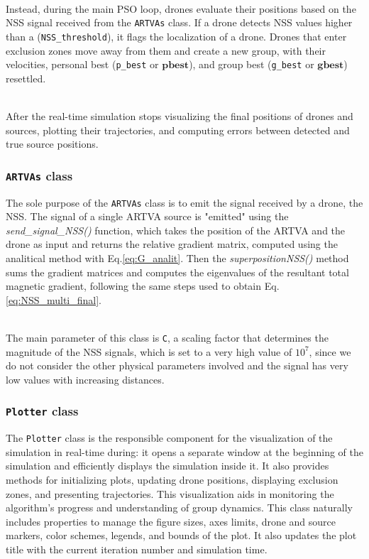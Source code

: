\documentclass[main]{subfiles}
\begin{document}
\noindent\\
Instead, during the main PSO loop, drones evaluate 
their positions based on the NSS signal received from the \texttt{ARTVAs} class. 
If a drone detects NSS values higher than a (\texttt{NSS\_threshold}),
it flags the localization of a drone.
Drones that enter exclusion zones move away from them and 
create a new group, with their velocities, 
personal best (\texttt{p\_best} or $\mathbf{pbest}$), and group best 
(\texttt{g\_best} or $\mathbf{gbest}$) resettled.

\noindent\\
After the real-time simulation stops visualizing the final 
positions of drones and sources, plotting their trajectories, 
and computing errors between detected and true source positions.

\subsubsection{\texttt{ARTVAs} class}
The sole purpose of the \texttt{ARTVAs} class is to 
emit the signal received by a drone, the NSS. 
The signal of a single ARTVA source is "emitted" using the \textit{send\_signal\_NSS()} 
function, which takes the position of the ARTVA and the drone as 
input and returns the relative gradient matrix,
computed using the analitical method with Eq.\ref{eq:G_analit}.
Then the \textit{superpositionNSS()} method sums 
the gradient matrices and computes the eigenvalues of the resultant 
total magnetic gradient,
following the same steps used to obtain Eq.\ref{eq:NSS_multi_final}.

\noindent\\
The main parameter of this class is \texttt{C}, a 
scaling factor that determines the magnitude of the NSS signals, 
which is set to a very high value of $10^7$, since we do not consider
the other physical parameters involved and the signal has very low values
with increasing distances.

\subsubsection{\texttt{Plotter} class}
The \texttt{Plotter} class is the responsible component 
for the visualization of the simulation in real-time during: 
it opens a separate window at the beginning
of the simulation and efficiently displays the simulation inside it.
It also provides methods for initializing plots, updating drone positions, 
displaying exclusion zones, and presenting trajectories. 
This visualization aids in monitoring the algorithm's 
progress and understanding of group dynamics.
This class naturally includes properties to manage 
the figure sizes, axes limits, drone and source markers, color schemes, 
legends, and bounds of the plot.
It also updates the plot title with the current iteration 
number and simulation time.
\end{document}
